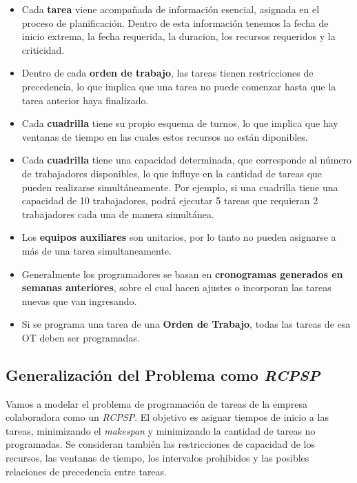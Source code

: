 \documentclass{article}
\begin{document}
\begin{itemize}
    \item Cada \textbf{tarea} viene acompañada de información esencial, asignada en el proceso de planificación. Dentro de esta información tenemos la fecha de inicio extrema, la fecha requerida, la duracion, los recursos requeridos y la criticidad.
    \item Dentro de cada \textbf{orden de trabajo}, las tareas tienen restricciones de precedencia, lo que implica que una tarea no puede comenzar hasta que la tarea anterior haya finalizado.
    
    \item Cada \textbf{cuadrilla} tiene su propio esquema de turnos, lo que implica que hay ventanas de tiempo en las cuales estos recursos no están diponibles.
    
    \item Cada \textbf{cuadrilla} tiene una capacidad determinada, que corresponde al número de trabajadores disponibles, lo que influye en la cantidad de tareas que pueden realizarse simultáneamente. Por ejemplo, si una cuadrilla tiene una capacidad de 10 trabajadores, podrá ejecutar 5 tareas que requieran 2 trabajadores cada una de manera simultánea.
    \item Los \textbf{equipos auxiliares} son unitarios, por lo tanto no pueden asignarse a más de una tarea simultaneamente.
    \item Generalmente los programadores se basan en \textbf{cronogramas generados en semanas anteriores}, sobre el cual hacen ajustes o incorporan las tareas nuevas que van ingresando.
    \item Si se programa una tarea de una \textbf{Orden de Trabajo}, todas las tareas de esa OT deben ser programadas.

\end{itemize}


\subsection{Generalización del Problema como \textit{RCPSP}}

Vamos a modelar el problema de programación de tareas de la empresa colaboradora como un \textit{RCPSP}. El objetivo es asignar tiempos de inicio a las tareas, minimizando el \textit{makespan} y minimizando la cantidad de tareas no programadas. Se consideran también las restricciones de capacidad de los recursos, las ventanas de tiempo, los intervalos prohibidos y las posibles relaciones de precedencia entre tareas.
\end{document}
